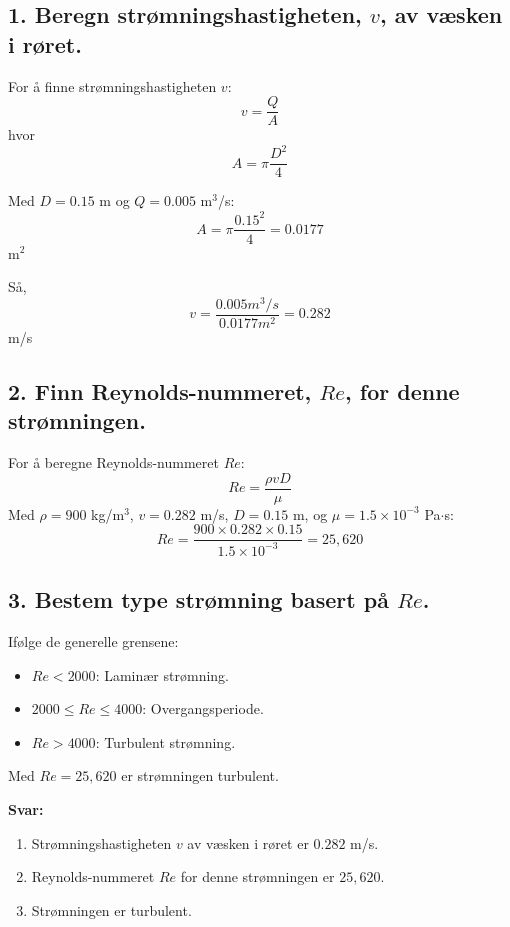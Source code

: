 






\subsection*{1. Beregn strømningshastigheten, \( v \), av væsken i røret.}
For å finne strømningshastigheten \( v \):
\[ v = \frac{Q}{A} \]
hvor
\[ A = \pi \frac{D^2}{4} \]

Med \( D = 0.15 \) m og \( Q = 0.005 \) m\(^3\)/s:
\[ A = \pi \frac{0.15^2}{4} = 0.0177 \] m\(^2\)

Så,
\[ v = \frac{0.005  m^3/s}{0.0177 m^2} = 0.282 \] m/s

\subsection*{2. Finn Reynolds-nummeret, \( Re \), for denne strømningen.}
For å beregne Reynolds-nummeret \( Re \):
\[ Re = \frac{\rho v D}{\mu} \]
Med \( \rho = 900 \) kg/m\(^3\), \( v = 0.282 \) m/s, \( D = 0.15 \) m, og \( \mu = 1.5 \times 10^{-3} \) Pa\(\cdot\)s:
\[ Re = \frac{900 \times 0.282 \times 0.15}{1.5 \times 10^{-3}} = 25,620 \]

\subsection*{3. Bestem type strømning basert på \( Re \).}
Ifølge de generelle grensene:
\begin{itemize}
    \item \( Re < 2000 \): Laminær strømning.
    \item \( 2000 \leq Re \leq 4000 \): Overgangsperiode.
    \item \( Re > 4000 \): Turbulent strømning.
\end{itemize}
Med \( Re = 25,620 \) er strømningen turbulent.

\textbf{Svar:}
\begin{enumerate}
    \item Strømningshastigheten \( v \) av væsken i røret er \( 0.282 \) m/s.
    \item Reynolds-nummeret \( Re \) for denne strømningen er \( 25,620 \).
    \item Strømningen er turbulent.
\end{enumerate}






